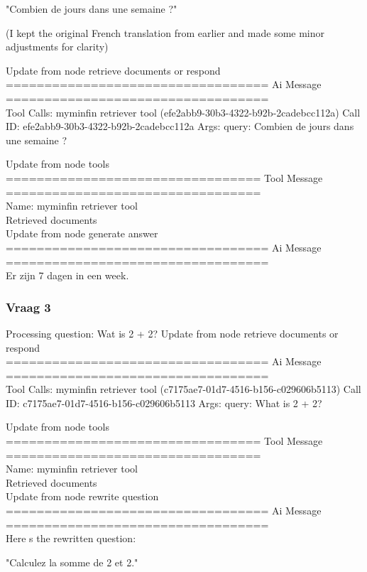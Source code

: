 "Combien de jours dans une semaine ?"

(I kept the original French translation from earlier and made some minor adjustments for clarity)

Update from node retrieve documents or respond
\\[1em]
================================== Ai Message ==================================
\\[1em]
Tool Calls:
myminfin retriever tool (efe2abb9-30b3-4322-b92b-2cadebcc112a)
Call ID: efe2abb9-30b3-4322-b92b-2cadebcc112a
Args:
query: Combien de jours dans une semaine ?

Update from node tools
\\[1em]
================================= Tool Message =================================
\\[1em]
Name: myminfin retriever tool
\\[1em]
Retrieved documents
\\[1em]
Update from node generate answer
\\[1em]
================================== Ai Message ==================================
\\[1em]
Er zijn 7 dagen in een week.
\subsubsection{Vraag 3}
Processing question: Wat is 2 + 2?
Update from node retrieve documents or respond
\\[1em]
================================== Ai Message ==================================
\\[1em]
Tool Calls:
myminfin retriever tool (c7175ae7-01d7-4516-b156-c029606b5113)
Call ID: c7175ae7-01d7-4516-b156-c029606b5113
Args:
query: What is 2 + 2?



Update from node tools
\\[1em]
================================= Tool Message =================================
\\[1em]
Name: myminfin retriever tool
\\[1em]
Retrieved documents
\\[1em]

Update from node rewrite question
\\[1em]
================================== Ai Message ==================================
\\[1em]
Here s the rewritten question:

"Calculez la somme de 2 et 2." 


